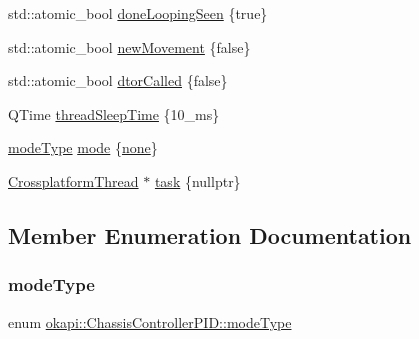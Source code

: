 \begin{DoxyCompactItemize}
\item 
std\+::atomic\+\_\+bool \mbox{\hyperlink{classokapi_1_1ChassisControllerPID_adc188c906f490119862f2de950a620d9}{done\+Looping\+Seen}} \{true\}
\item 
std\+::atomic\+\_\+bool \mbox{\hyperlink{classokapi_1_1ChassisControllerPID_ad83f673aa55a0d76854421ba49716e00}{new\+Movement}} \{false\}
\item 
std\+::atomic\+\_\+bool \mbox{\hyperlink{classokapi_1_1ChassisControllerPID_a169c997aacc8ece4c23a87813bcdc0f2}{dtor\+Called}} \{false\}
\item 
Q\+Time \mbox{\hyperlink{classokapi_1_1ChassisControllerPID_abf4470c68c13038a86223777262e0cda}{thread\+Sleep\+Time}} \{10\+\_\+ms\}
\item 
\mbox{\hyperlink{classokapi_1_1ChassisControllerPID_a74792367688870f72f88c486c96b8368}{mode\+Type}} \mbox{\hyperlink{classokapi_1_1ChassisControllerPID_a62145d8e5be9b686b55bd63acc4bc5e7}{mode}} \{\mbox{\hyperlink{classokapi_1_1ChassisControllerPID_a74792367688870f72f88c486c96b8368a7727725f70ef5c5845fdc2004c6cedd7}{none}}\}
\item 
\mbox{\hyperlink{classCrossplatformThread}{Crossplatform\+Thread}} $\ast$ \mbox{\hyperlink{classokapi_1_1ChassisControllerPID_ade2afa27a8ddb659ab00d714f2503722}{task}} \{nullptr\}
\end{DoxyCompactItemize}


\subsection{Member Enumeration Documentation}
\mbox{\label{classokapi_1_1ChassisControllerPID_a74792367688870f72f88c486c96b8368}} 
\subsubsection{\texorpdfstring{modeType}{modeType}}
{\footnotesize\ttfamily enum \mbox{\hyperlink{classokapi_1_1ChassisControllerPID_a74792367688870f72f88c486c96b8368}{okapi\+::\+Chassis\+Controller\+P\+I\+D\+::mode\+Type}}\hspace{0.3cm}{\ttfamily [protected]}}


